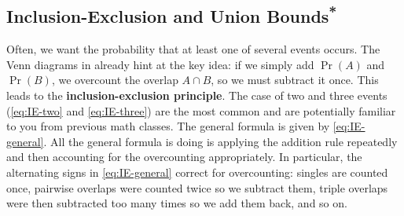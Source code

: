 

\subsection{\texorpdfstring{Inclusion-Exclusion and Union Bounds\textsuperscript{*}}{Inclusion-Exclusion and Union Bounds}}
Often, we want the probability that at least one of several events occurs. The Venn diagrams in  already hint at the key idea: if we simply add $\Pr(A)$ and $\Pr(B)$, we overcount the overlap $A\cap B$, so we must subtract it once. This leads to the \textbf{inclusion-exclusion principle}. The case of two and three events (\autoref{eq:IE-two} and \autoref{eq:IE-three}) are the most common and are potentially familiar to you from previous math classes. The general formula is given by \autoref{eq:IE-general}. All the general formula is doing is applying the addition rule repeatedly and then accounting for the overcounting appropriately. In particular, the alternating signs in \autoref{eq:IE-general} correct for overcounting: singles are counted once, pairwise overlaps were counted twice so we subtract them, triple overlaps were then subtracted too many times so we add them back, and so on.

